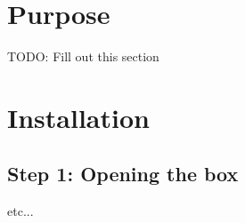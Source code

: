 \hypertarget{index_Purpose}{}\section{Purpose}\label{index_Purpose}
T\+O\+D\+O\+: Fill out this section\hypertarget{index_install_sec}{}\section{Installation}\label{index_install_sec}
\hypertarget{index_step1}{}\subsection{Step 1\+: Opening the box}\label{index_step1}
etc... 
